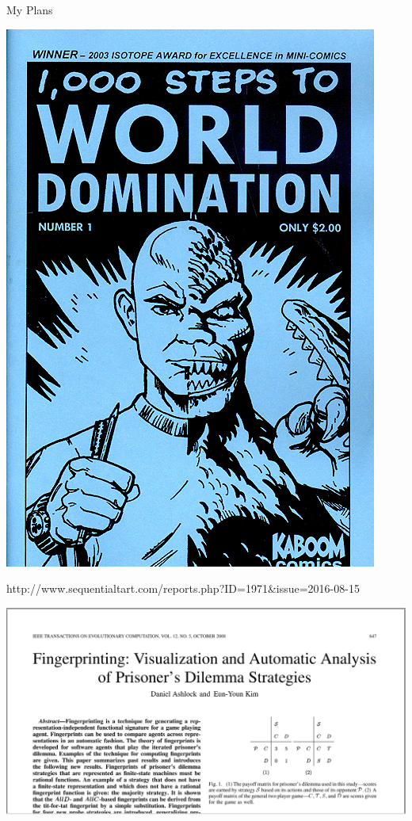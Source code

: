 \documentclass{beamer}
\begin{document}
\begin{frame}{My Plans}
	\begin{center}
		\includegraphics[width=.40\textwidth]{static/evil-mastermind.png}
	\end{center}

\hfill \tiny http://www.sequentialtart.com/reports.php?ID=1971\&issue=2016-08-15

\end{frame}

\begin{frame}
	\begin{center}
		\includegraphics[width=.80\textwidth]{static/ashlock.png}
	\end{center}
\end{frame}
\end{document}
